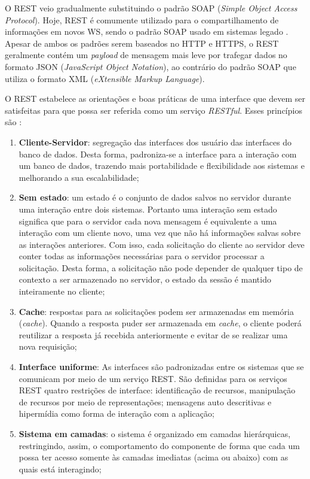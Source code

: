 O REST veio gradualmente substituindo o padrão SOAP (\textit{Simple Object Access Protocol}). Hoje, REST é comumente utilizado para o compartilhamento de informações em novos WS, sendo o padrão SOAP usado em sistemas legado \cite{serrano2014soaplegacy}. Apesar de ambos os padrões serem baseados no HTTP e HTTPS, o REST geralmente contém um \textit{payload} de mensagem mais leve por trafegar dados no formato JSON (\textit{JavaScript Object Notation}), ao contrário do padrão SOAP que utiliza o formato XML (\textit{eXtensible Markup Language}).

O REST estabelece as orientações e boas práticas de uma interface que devem ser satisfeitas para que possa ser referida como um serviço \textit{RESTful}. Esses princípios são \cite{fielding2000rest}:

\begin{enumerate}
	\item \textbf{Cliente-Servidor}: segregação das interfaces dos usuário das interfaces do banco de dados. Desta forma, padroniza-se a interface para a interação com um banco de dados, trazendo mais portabilidade e flexibilidade aos sistemas e melhorando a sua escalabilidade;

	\item \textbf{Sem estado}: um estado é o conjunto de dados salvos no servidor durante uma interação entre dois sistemas. Portanto uma interação sem estado significa que para o servidor cada nova mensagem é equivalente a uma interação com um cliente novo, uma vez que não há informações salvas sobre as interações anteriores. Com isso, cada solicitação do cliente ao servidor deve conter todas as informações necessárias para o servidor processar a solicitação. Desta forma, a solicitação não pode depender de qualquer tipo de contexto a ser armazenado no servidor, o estado da sessão é mantido inteiramente no cliente;

	\item \textbf{Cache}: respostas para as solicitações podem ser armazenadas em memória (\textit{cache}). Quando a resposta puder ser armazenada em \textit{cache}, o cliente poderá reutilizar a resposta já recebida anteriormente e evitar de se realizar uma nova requisição;

	\item \textbf{Interface uniforme}: As interfaces são padronizadas entre os sistemas que se comunicam por meio de um serviço REST. São definidas para os serviços REST quatro restrições de interface: identificação de recursos, manipulação de recursos por meio de representações; mensagens auto descritivas e hipermídia como forma de interação com a aplicação;

	\item \textbf{Sistema em camadas}: o sistema é organizado em camadas hierárquicas, restringindo, assim, o comportamento do componente de forma que cada um possa ter acesso somente às camadas imediatas (acima ou abaixo) com as quais está interagindo;
\end{enumerate}

